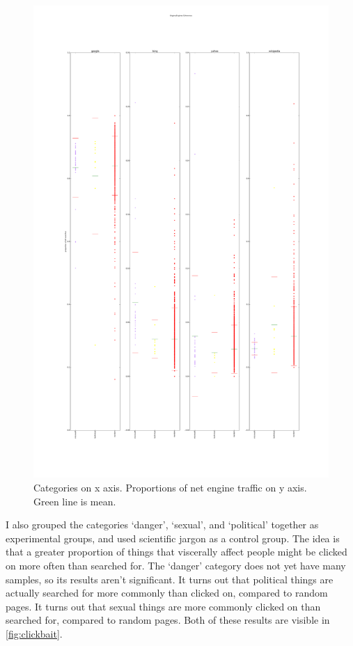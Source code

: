 \documentclass{article}
\begin{document}
\begin{figure}
    \includegraphics[width=\textwidth]{results/Microsoft_Bing_Engine_Engines_Coherence.pdf}
    \caption{Categories on x axis. Proportions of net engine traffic on y axis. Green line is mean.} \label{fig:ms}
\end{figure}

I also grouped the categories ‘danger’, ‘sexual’, and ‘political’ together as experimental groups, and used scientific jargon as a control group. The idea is that a greater proportion of things that viscerally affect people might be clicked on more often than searched for. The ‘danger’ category does not yet have many samples, so its results aren’t significant. It turns out that political things are actually searched for more commonly than clicked on, compared to random pages. It turns out that sexual things are more commonly clicked on than searched for, compared to random pages. Both of these results are visible in \cref{fig:clickbait}. 
\end{document}
